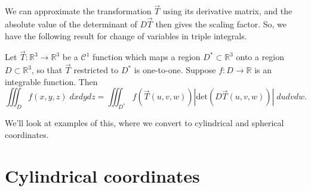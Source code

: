 \documentclass{ximera}
\begin{document}
We can approximate the transformation $\vec{T}$ using its derivative matrix, and the absolute value of the determinant of $D\vec{T}$ then gives the scaling factor. So, we have the following result for change of variables in triple integrals.

\begin{proposition}
Let $\vec{T}:\mathbb{R}^3\rightarrow\mathbb{R}^3$ be a $\mathcal{C}^1$ function which maps a region $D^*\subset\mathbb{R}^3$ onto a region $D\subset\mathbb{R}^3$, so that $\vec{T}$ restricted to $D^*$ is one-to-one. Suppose $f:D\rightarrow\mathbb{R}$ is an integrable function. Then
\[
\iiint_D f(x,y,z)\;dxdydz = \iiint_{D^*} f(\vec{T}(u,v,w))\left|\text{det}(D\vec{T}(u,v,w))\right|\;dudvdw.
\]
\end{proposition}

We'll look at examples of this, where we convert to cylindrical and spherical coordinates.

\section*{Cylindrical coordinates}
\end{document}
